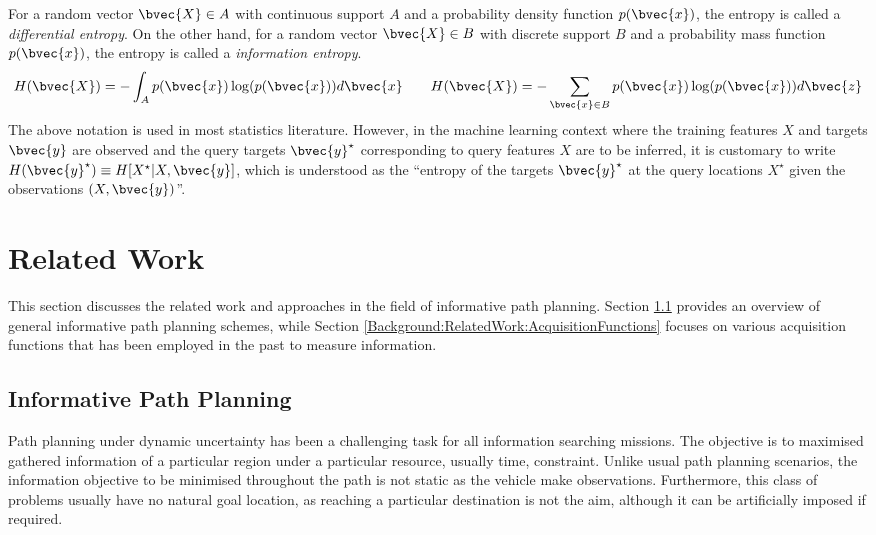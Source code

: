 			For a random vector $\bvec{X} \in A$ with continuous support $A$ and a probability density function $p(\bvec{x})$, the entropy is called a \textit{differential entropy}. On the other hand, for a random vector $\bvec{X} \in B$ with discrete support $B$ and a probability mass function $p(\bvec{x})$, the entropy is called a \textit{information entropy}. \begin{equation}
				H(\bvec{X}) = - \int_{A} p(\bvec{x}) \log(p(\bvec{x})) d\bvec{x} \qquad H(\bvec{X}) = - \sum_{\bvec{x} \in B} p(\bvec{x}) \log(p(\bvec{x})) d\bvec{z}
			\label{Equation:Entropy}
			\end{equation} The above notation is used in most statistics literature. However, in the machine learning context where the training features $X$ and targets $\bvec{y}$ are observed and the query targets $\bvec{y}^{\star}$ corresponding to query features $X$ are to be inferred, it is customary to write $H(\bvec{y}^{\star}) \equiv H[X^{\star} | X, \bvec{y}]$, which is understood as the ``entropy of the targets $\bvec{y}^{\star}$ at the query locations $X^{\star}$ given the observations $(X, \bvec{y})$''.

	\section{Related Work}
	\label{Background:RelatedWork}
		
		This section discusses the related work and approaches in the field of informative path planning. Section \ref{Background:RelatedWork:InformativePathPlanning} provides an overview of general informative path planning schemes, while Section \ref{Background:RelatedWork:AcquisitionFunctions} focuses on various acquisition functions that has been employed in the past to measure information.
				
		\subsection{Informative Path Planning}
		\label{Background:RelatedWork:InformativePathPlanning}
			
			Path planning under dynamic uncertainty has been a challenging task for all information searching missions. The objective is to maximised gathered information of a particular region under a particular resource, usually time, constraint. Unlike usual path planning scenarios, the information objective to be minimised throughout the path is not static as the vehicle make observations. Furthermore, this class of problems usually have no natural goal location, as reaching a particular destination is not the aim, although it can be artificially imposed if required.
		

